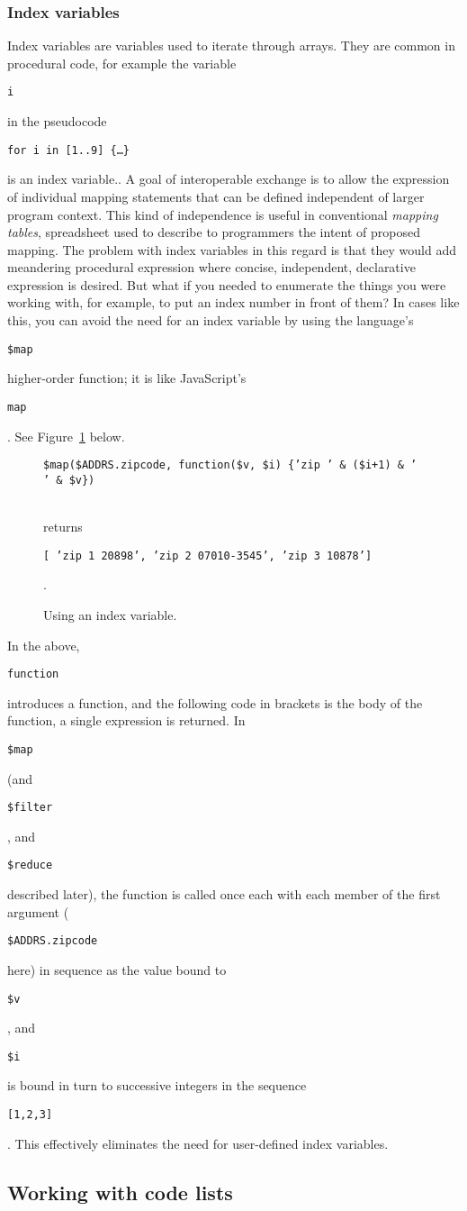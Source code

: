 \documentclass[9pt,letterpaper]{article}
\newcommand{\stt}[1]{\begin{footnotesize}\texttt{#1}\end{footnotesize}}
\begin{document}
\subsubsection{Index variables} %
Index variables are variables used to iterate through arrays.
They are common in procedural code, for example the variable \stt{i} in the pseudocode \stt{for i in [1..9] \{\ldots \}} is an index variable..
A goal of interoperable exchange is to allow the expression of individual mapping statements that can be defined independent of larger program context.
This kind of independence is useful in conventional \textit{mapping tables}, spreadsheet used to describe to programmers the intent of proposed mapping.
The problem with index variables in this regard is that they would add meandering procedural expression where concise, independent, declarative expression is desired.
But what if you needed to enumerate the things you were working with, for example, to put an index number in front of them?
In cases like this, you can avoid the need for an index variable by using the language's \stt{\$map} higher-order function; it is like JavaScript's \stt{map}. 
See Figure~\ref{code:index-in-map} below.

\begin{figure}[H]
    \caption{Using an index variable.}
    \label{code:index-in-map}
\vspace{3mm}    
    \stt{\$map(\$ADDRS.zipcode, function(\$v, \$i) \{'zip ' \& (\$i+1) \& ' ' \& \$v\})}\\
\vspace{3mm}    
returns \\
 \stt{[ 'zip 1 20898', 'zip 2 07010-3545', 'zip 3 10878']}.
\end{figure}

In the above, \stt{function} introduces a function, and the following code in brackets is the body of the function, a single expression is returned.
In \stt{\$map} (and \stt{\$filter}, and \stt{\$reduce} described later), the function is called once each with each member of the first argument (\stt{\$ADDRS.zipcode} here) in sequence
as the value bound to \stt{\$v}, and \stt{\$i} is bound in turn to successive integers in the sequence \stt{[1,2,3]}.
This effectively eliminates the need for user-defined index variables.

\subsection{Working with code lists}
\end{document}
